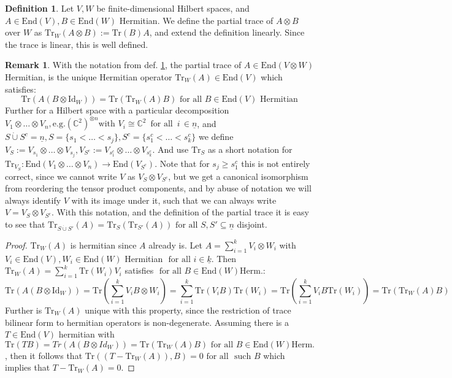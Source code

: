 \documentclass{article}
\def\C{\mathbb{C}}
\def\n{\underline{n}}
\def\End{\text{End}}
\def\fa{\text{ for all }}
\def\Tr{\text{Tr}}
\def\Id{\text{Id}}
\theoremstyle{definition}
\newtheorem{rem}[Satz]{Remark}
\newtheorem{defn}[Satz]{Definition}
\begin{document}
\begin{defn}\label{traces}
Let $V, W$ be finite-dimensional Hilbert spaces, and $A \in \text{End}(V), B \in \End(W)$ Hermitian. We define the partial trace of $A \otimes B$ over $W$ as $\Tr_W(A \otimes B) := \Tr(B) A$, and extend the definition linearly. Since the trace is linear, this is well defined.
\end{defn}
\begin{rem}
With the notation from def. \ref{traces}, the partial trace of $A \in \End(V \otimes W)$ Hermitian, is the unique Hermitian operator $\Tr_W(A) \in \End(V)$ which satisfies:
 \begin{equation} \Tr(A(B \otimes \Id_W)) = \Tr(\Tr_W(A)B) \fa B \in \End(V) \text{ Hermitian} \end{equation}
Further for a Hilbert space with a particular decomposition $V_1 \otimes \ldots \otimes V_n, \text{e.g.} (\C^2)^{\otimes n} \text{with } V_i \cong \C^2 \, \fa \, i \, \in \n$, and $S \dot{\cup} S^c = \underline{n}, S = \{ s_1 < \ldots < s_j \}, S^c = \{ s^c_1 < \ldots < s^c_k \}$ we define $V_S := V_{s_1} \otimes \ldots \otimes V_{s_j}, V_{S^c} := V_{s^c_1} \otimes \ldots \otimes V_{s^c_k}$.
And use $\Tr_S$  as a short notation for $\Tr_{V_S} : \End(V_1 \otimes \ldots \otimes V_n) \rightarrow \End(V_{S^c})$. Note that for $s_j \geq s_1^c$ this is not entirely correct, since we cannot write $V$ as $V_S \otimes V_{S^c}$, but we get a canonical isomorphism from reordering the tensor product components, and by abuse of notation we will always identify $V$ with its image under it, such that we can always write $V = V_S \otimes V_{S^c}$.
With this notation, and the definition of the partial trace it is easy to see that $\Tr_{S \dot \cup S'}(A) = \Tr_S(\Tr_{S'}(A)) \fa S,S' \subseteq \n$ disjoint.
\begin{proof}
$ \Tr_W(A)$ is hermitian since $A$ already is. Let $ A = \sum_{i=1}^k V_i \otimes W_i$ with $V_i \in \End(V), W_i \in \End(W)$ Hermitian $\fa i \in \underline{k}$. Then $\Tr_W(A) = \sum_{i=1}^k \Tr(W_i) V_i$ satisfies  $\fa B \in \End(W) \text{Herm.}$:
\[ \Tr(A(B \otimes \Id_W)) = \Tr( \sum_{i=1}^k V_i B \otimes W_i ) = \sum_{i=1}^k \Tr(V_i B) \Tr(W_i) = \Tr( \sum_{i=1}^k V_i B \Tr(W_i)) = \Tr( \Tr_W(A) B)\]
Further is $\Tr_W(A)$ unique with this property, since the restriction of trace bilinear form to hermitian operators is non-degenerate. Assuming there is a $T \in \End(V)$ hermitian with $\Tr(TB) = Tr(A(B \otimes Id_W)) = \Tr(\Tr_W(A)B) \fa B \in \End(W) \text{Herm.}$, 
then it follows that $\Tr( (T-\Tr_W(A)), B) = 0 \fa \text{ such } B$ which implies that $ T - \Tr_W(A) = 0$.
\end{proof}
\end{rem}
\end{document}
